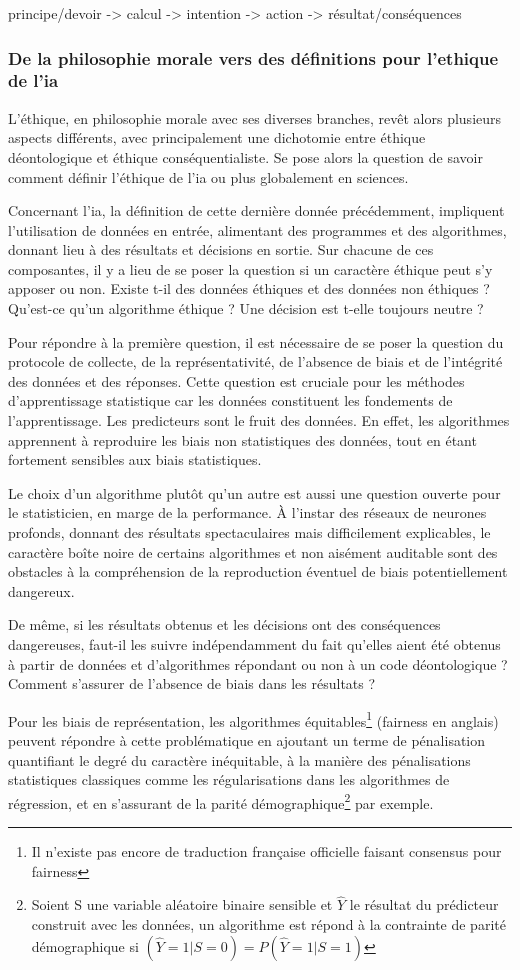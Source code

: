 principe/devoir -> calcul -> intention -> action -> résultat/conséquences
\subsubsection{De la philosophie morale vers des définitions pour l'ethique de l'\gls{ia}}

L'éthique, en philosophie morale avec ses diverses branches, revêt alors plusieurs aspects différents, avec principalement une dichotomie entre éthique déontologique et éthique conséquentialiste. Se pose alors la question de savoir comment définir l'éthique de l'\gls{ia} ou plus globalement en sciences.

Concernant l'\gls{ia}, la définition de cette dernière donnée précédemment, impliquent l'utilisation de données en entrée, alimentant des programmes et des algorithmes, donnant lieu à des résultats et décisions en sortie. Sur chacune de ces composantes, il y a lieu de se poser la question si un caractère éthique peut s'y apposer ou non. Existe t-il des données éthiques et des données non éthiques ? Qu'est-ce qu'un algorithme éthique ? Une décision est t-elle toujours neutre ?

Pour répondre à la première question, il est nécessaire de se poser la question du protocole de collecte, de la représentativité, de l'absence de biais et de l'intégrité des données et des réponses. Cette question est cruciale pour les méthodes d'apprentissage statistique car les données constituent les fondements de l'apprentissage. Les predicteurs sont le fruit des données. En effet, les algorithmes apprennent à reproduire les biais non statistiques des données, tout en étant fortement sensibles aux biais statistiques.

Le choix d'un algorithme plutôt qu'un autre est aussi une question ouverte pour le statisticien, en marge de la performance. À l'instar des réseaux de neurones profonds, donnant des résultats spectaculaires mais difficilement explicables, le caractère boîte noire de certains algorithmes et non aisément auditable sont des obstacles à la compréhension de la reproduction éventuel de biais potentiellement dangereux.

De même, si les résultats obtenus et les décisions ont des conséquences dangereuses, faut-il les suivre indépendamment du fait qu'elles aient été obtenus à partir de données et d'algorithmes répondant ou non à un code déontologique ? Comment s'assurer de l'absence de biais dans les résultats ?

Pour les biais de représentation, les algorithmes équitables\footnote{Il n'existe pas encore de traduction française officielle faisant consensus pour \gls{fairness}} (\gls{fairness} en anglais) peuvent répondre à cette problématique en ajoutant un terme de pénalisation quantifiant le degré du caractère inéquitable, à la manière des pénalisations statistiques classiques comme les régularisations dans les algorithmes de régression, et en s'assurant de la parité démographique\footnote{Soient S une variable aléatoire binaire sensible et $\hat{Y}$ le résultat du prédicteur construit avec les données, un algorithme est répond à la contrainte de parité démographique si $(\hat{Y}=1|S=0)=P(\hat{Y}=1|S=1)$} par exemple. 

